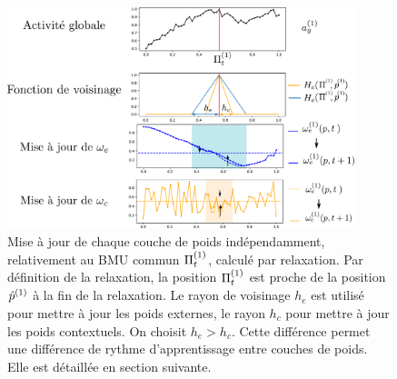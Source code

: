 \documentclass[../main]{subfiles}
\begin{document}
\begin{figure}
\centering
\includegraphics[width=0.9\textwidth]{maj_2som.pdf}
\caption{Mise à jour de chaque couche de poids indépendamment, relativement au BMU commun $\Pi^{({1})}_t$, calculé par relaxation. Par définition de la relaxation, la position $\Pi^{({1})}_t$ est proche de la position $\hat{p}^{({1})}$ à la fin de la relaxation. Le rayon de voisinage $h_e$ est utilisé pour mettre à jour les poids externes, le rayon $h_c$ pour mettre à jour les poids contextuels. On choisit $h_e > h_c$. Cette différence permet une différence de rythme d'apprentissage entre couches de poids. Elle est détaillée en section suivante.\label{fig:maj}}
\end{figure}
\end{document}
